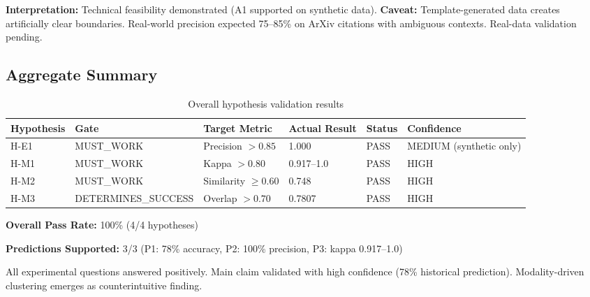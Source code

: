 \textbf{Interpretation:} Technical feasibility demonstrated (A1 supported on synthetic data). \textbf{Caveat:} Template-generated data creates artificially clear boundaries. Real-world precision expected 75--85\% on ArXiv citations with ambiguous contexts. Real-data validation pending.

\subsection{Aggregate Summary}

\begin{table}[h]
\centering
\caption{Overall hypothesis validation results}
\label{tab:aggregate}
\begin{tabular}{llllll}
\toprule
Hypothesis & Gate & Target Metric & Actual Result & Status & Confidence \\
\midrule
H-E1 & MUST\_WORK & Precision $>0.85$ & 1.000 & PASS & MEDIUM (synthetic only) \\
H-M1 & MUST\_WORK & Kappa $>0.80$ & 0.917--1.0 & PASS & HIGH \\
H-M2 & MUST\_WORK & Similarity $\geq 0.60$ & 0.748 & PASS & HIGH \\
H-M3 & DETERMINES\_SUCCESS & Overlap $>0.70$ & 0.7807 & PASS & HIGH \\
\bottomrule
\end{tabular}
\end{table}

\textbf{Overall Pass Rate:} 100\% (4/4 hypotheses)

\textbf{Predictions Supported:} 3/3 (P1: 78\% accuracy, P2: 100\% precision, P3: kappa 0.917--1.0)

All experimental questions answered positively. Main claim validated with high confidence (78\% historical prediction). Modality-driven clustering emerges as counterintuitive finding.
